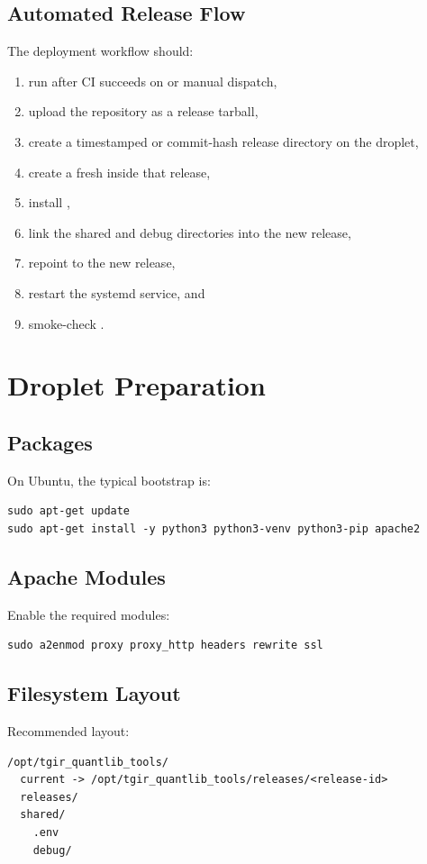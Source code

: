 \documentclass[11pt]{article}
\begin{document}
\subsection{Automated Release Flow}
The deployment workflow should:
\begin{enumerate}[leftmargin=1.5em]
    \item run after CI succeeds on  or manual dispatch,
    \item upload the repository as a release tarball,
    \item create a timestamped or commit-hash release directory on the droplet,
    \item create a fresh  inside that release,
    \item install ,
    \item link the shared  and debug directories into the new release,
    \item repoint  to the new release,
    \item restart the systemd service, and
    \item smoke-check .
\end{enumerate}

\section{Droplet Preparation}
\subsection{Packages}
On Ubuntu, the typical bootstrap is:
\begin{lstlisting}
sudo apt-get update
sudo apt-get install -y python3 python3-venv python3-pip apache2
\end{lstlisting}

\subsection{Apache Modules}
Enable the required modules:
\begin{lstlisting}
sudo a2enmod proxy proxy_http headers rewrite ssl
\end{lstlisting}

\subsection{Filesystem Layout}
Recommended layout:
\begin{lstlisting}
/opt/tgir_quantlib_tools/
  current -> /opt/tgir_quantlib_tools/releases/<release-id>
  releases/
  shared/
    .env
    debug/
\end{lstlisting}
\end{document}
